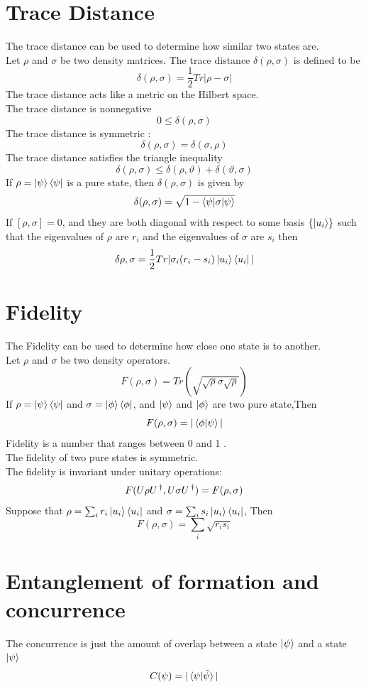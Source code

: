 \documentclass[12pt,oneside]{book}
\begin{document}
\section{Trace Distance}
    The trace distance  can be used to determine how similar two states are.\\
    Let $\rho$ and $\sigma$ be two density matrices. The trace distance $\delta(\rho,\sigma)$ is defined to be 
    \[ \delta(\rho,\sigma) = \frac{1}{2}Tr|\rho -\sigma| \]
    The trace distance acts like a metric on the Hilbert space.\\
    The trace distance is nonnegative 
    \[ 0 \leq \delta(\rho,\sigma)\]
    The trace distance is symmetric : 
    \[ \delta(\rho,\sigma) = \delta(\sigma,\rho) \]
    The trace distance satisfies the triangle inequality 
    \[ \delta(\rho,\sigma) \leq \delta(\rho,\vartheta) + \delta(\vartheta,\sigma) \]
    If $\rho = \ket{\psi}\bra{\psi}$ is a pure state, then $\delta(\rho,\sigma)$ is given by 
    \[ \delta(\rho,\sigma) = \sqrt{1 - \braket{\psi|\sigma|\psi}} \]
    If $[\rho,\sigma ] = 0$, and they are both diagonal with respect to some basis $\{ \ket{u_i} \}$ such that the eigenvalues of $\rho$ are $r_i$ and the eigenvalues of $\sigma$ are $s_i$ then 
    \[ \delta{\rho,\sigma} = \frac{1}{2}Tr| \sigma_i(r_i - s_i)\ket{u_i}\bra{u_i} | \]
\section{ Fidelity }
    The Fidelity can be used to determine how close one state is to another.\\
    Let $\rho$ and $\sigma$ be two density operators.
    \[ F(\rho,\sigma) = Tr(\sqrt{\sqrt{\rho}\sigma\sqrt{\rho}}) \]
    If $\rho = \ket{\psi}\bra{\psi}$ and $\sigma = \ket{\phi}\bra{\phi}$, and $\ket{\psi}$ and $\ket{\phi}$ are two pure state,Then 
    \[ F(\rho,\sigma) = | \braket{\phi|\psi} | \]
    Fidelity is a number that ranges between 0 and 1 . \\
    The fidelity of two pure states is symmetric.\\
    The fidelity is invariant under unitary operations:
    \[ F(U\rho U\operatorname{^\dagger} , U \sigma U\operatorname{^\dagger}) = F(\rho,\sigma) \]
    Suppose that $\rho = \sum_i r_i\ket{u_i}\bra{u_i}$ and $\sigma = \sum_i s_i\ket{u_i}\bra{u_i}$, Then 
    \[ F(\rho,\sigma) = \sum_i \sqrt{r_is_i} \]
\section{Entanglement of formation and concurrence}
    The concurrence is just the amount of overlap between a state $\ket{\psi}$ and a state $\ket{\psi}$
    \[ C(\psi) = |\braket{\psi|\tilde{\psi}}| \]
\end{document}
